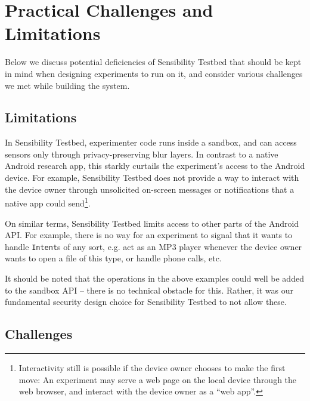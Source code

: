 \section{Practical Challenges and Limitations}\label{sec-limitation}

Below we discuss potential deficiencies of Sensibility Testbed 
that should be kept in mind when designing experiments to run on it, 
and consider various challenges we met while building the system.

\subsection{Limitations}\label{subsec-limitations}
In Sensibility Testbed, experimenter code runs inside a sandbox, and 
can access sensors only through privacy-preserving blur layers. 
In contrast to a native Android research app, this starkly curtails 
the experiment's access to the Android device. For example, Sensibility 
Testbed does not provide a way to interact with the device owner 
through unsolicited on-screen messages or notifications that a native 
app could send\footnote{Interactivity still is possible if the device 
owner chooses to make the first move: An experiment may serve a web 
page on the local device through the web browser, and interact with 
the device owner as a ``web app''.}. 

On similar terms, Sensibility Testbed limits access to other parts 
of the Android API. For example, there is no way for an experiment to 
signal that it wants to handle \texttt{Intent}s of any sort, e.g. 
act as an MP3 player whenever the device owner wants to open a file 
of this type, or handle phone calls, etc.

It should be noted that the operations in the above examples 
could well be added to the sandbox API -- there is no technical 
obstacle for this. Rather, it was our fundamental security design 
choice for Sensibility Testbed to not allow these.


\subsection{Challenges}\label{subsec-challenges}


